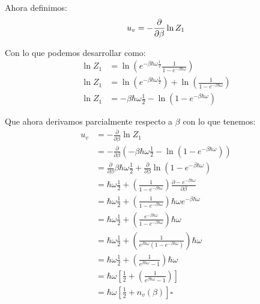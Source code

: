 \documentclass{report}
\begin{document}
Ahora definimos: \[
	u_v = - \frac{\partial}{\partial \beta} \ln Z_1\\
\]

Con lo que podemos desarrollar como:
\begin{align*}
	\ln Z_1 &= \ln \left( e^{-\beta \hbar \omega \frac{1}{2}} \frac{1}{1 - e^{-\beta\hbar\omega}} \right)\\
	\ln Z_1 &= \ln \left( e^{-\beta \hbar \omega \frac{1}{2}}\right) + \ln \left( \frac{1}{1 - e^{-\beta\hbar\omega}} \right)\\
	\ln Z_1 &= -\beta \hbar \omega \frac{1}{2} - \ln \left( 1 - e^{-\beta\hbar\omega} \right)
\end{align*}

Que ahora derivamos parcialmente respecto a $\beta$ con lo que tenemos:
\begin{align*}
	u_v &= - \frac{\partial}{\partial \beta} \ln Z_1\\
	&= - \frac{\partial}{\partial \beta} \left( -\beta \hbar \omega \frac{1}{2} - \ln \left( 1 - e^{-\beta\hbar\omega} \right) \right) \\
	&= \frac{\partial}{\partial \beta} \beta \hbar \omega \frac{1}{2} + \frac{\partial}{\partial \beta}\ln \left( 1 - e^{-\beta\hbar\omega} \right) \\
	&= \hbar \omega \frac{1}{2} + \left( \frac{1}{1 - e^{-\beta\hbar\omega}} \right) \frac{\partial - e^{-\beta\hbar\omega}}{\partial \beta}\\
	&= \hbar \omega \frac{1}{2} + \left( \frac{1}{1 - e^{-\beta\hbar\omega}} \right) \hbar\omega e^{-\beta\hbar\omega}\\
	&= \hbar \omega \frac{1}{2} + \left( \frac{e^{-\beta\hbar\omega}}{1 - e^{-\beta\hbar\omega}} \right) \hbar\omega \\
	&= \hbar \omega \frac{1}{2} + \left( \frac{1}{e^{\beta\hbar\omega}\left(1 - e^{-\beta\hbar\omega}\right)} \right) \hbar\omega \\
	&= \hbar \omega \frac{1}{2} + \left( \frac{1}{e^{\beta\hbar\omega} - 1} \right) \hbar\omega \\
	&= \hbar\omega\left[\frac{1}{2} + \left( \frac{1}{e^{\beta\hbar\omega} - 1} \right)\right] \\
	&= \hbar\omega\left[\frac{1}{2} + n_v(\beta)\right]\square \\
\end{align*}

\section{}
\end{document}
